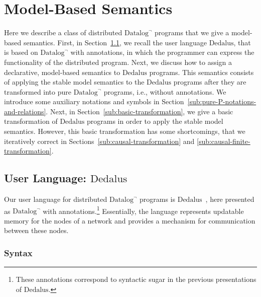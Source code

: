 \documentclass{tlp}
\newcommand{\langname}[1]{\text{#1}}  \newcommand{\pred}[1]{\mathtt{#1}}  \newcommand{\fname}[1]{\mathit{#1}}  \newcommand{\sq}[1]{`{#1}'}
\newcommand{\dedalus}{\langname{Dedalus}}
\newcommand{\datalogneg}{\langname{Datalog}^{\neg}}
\begin{document}
\section{Model-Based Semantics}

\label{sec:declarative}

Here we describe a class of distributed $\datalogneg$ programs that
we give a model-based semantics. First, in Section~\ref{sub:user-language},
we recall the user language $\dedalus$, that is based on $\datalogneg$ with annotations,
in which the programmer can express the functionality of the distributed
program. Next, we discuss how to assign a declarative, model-based
semantics to $\dedalus$ programs. This semantics consists of applying
the stable model semantics to the $\dedalus$ programs after they are transformed
into pure $\datalogneg$ programs, i.e., without annotations. We introduce
some auxiliary notations and symbols in Section~\ref{sub:pure-P-notations-and-relations}.
Next, in Section~\ref{sub:basic-transformation}, we give a basic
transformation of $\dedalus$ programs in order to apply the stable model
semantics. However, this basic transformation has some shortcomings,
that we iteratively correct in Sections~\ref{sub:causal-transformation} and
\ref{sub:causal-finite-transformation}.

\subsection{User Language: $\dedalus$}

\label{sub:user-language}

\newcommand{\simplebody}[1]{\mathbf{B}\{#1\}}

\newcommand{\sugind}{\bullet}

\newcommand{\sugas}[1]{\mid#1}

\newcommand{\relid}{\pred{Id}}

\newcommand{\relnode}{\pred{Node}}


Our user language for distributed $\datalogneg$ programs is $\dedalus$~\cite{dedalus,dedalus-datalog20,hellerstein_declimp},
here presented as $\datalogneg$ with annotations.\footnote{These annotations correspond to syntactic sugar in the previous presentations
of $\dedalus$.} Essentially, the language represents updatable memory for the nodes
of a network and provides a mechanism for communication between these
nodes.

\subsubsection{Syntax}
\end{document}
